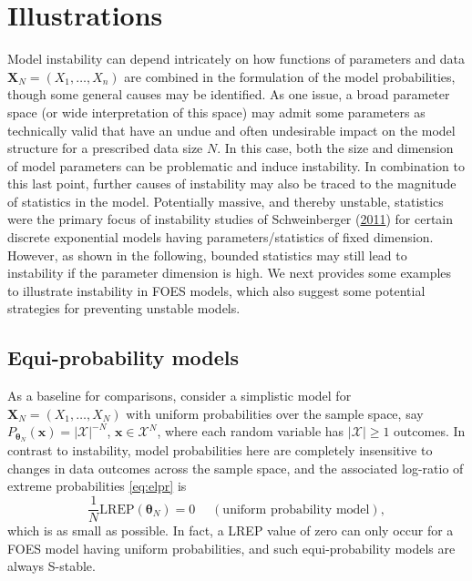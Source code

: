 \documentclass[]{article}
\theoremstyle{definition}
\newcommand{\REP}{\mathrm{LREP}}
\begin{document}
\section{Illustrations}\label{illustrations}

Model instability can depend intricately on how functions of parameters
and data \(\boldsymbol X_N=(X_1,\ldots,X_n)\) are combined in the
formulation of the model probabilities, though some general causes may
be identified. As one issue, a broad parameter space (or wide
interpretation of this space) may admit some parameters as technically
valid that have an undue and often undesirable impact on the model
structure for a prescribed data size \(N\). In this case, both the size
and dimension of model parameters can be problematic and induce
instability. In combination to this last point, further causes of
instability may also be traced to the magnitude of statistics in the
model. Potentially massive, and thereby unstable, statistics were the
primary focus of instability studies of Schweinberger
(\protect\hyperlink{ref-schweinberger2011instability}{2011}) for certain
discrete exponential models having parameters/statistics of fixed
dimension. However, as shown in the following, bounded statistics may
still lead to instability if the parameter dimension is high. We next
provides some examples to illustrate instability in FOES models, which
also suggest some potential strategies for preventing unstable models.

\subsection{Equi-probability models}\label{equi-probability-models}

As a baseline for comparisons, consider a simplistic model for
\(\boldsymbol X_N=(X_1,\ldots,X_N)\) with uniform probabilities over the
sample space, say
\(P_{\boldsymbol \theta_N}(\boldsymbol x)= |\mathcal{X}|^{-N}\),
\(\boldsymbol x \in \mathcal{X}^N\), where each random variable has
\(|\mathcal{X}| \geq 1\) outcomes. In contrast to instability, model
probabilities here are completely insensitive to changes in data
outcomes across the sample space, and the associated log-ratio of
extreme probabilities \eqref{eq:elpr} is \[
\frac{1}{N} \REP(\boldsymbol \theta_N)=0\quad \;(\mbox{uniform probability model}),
\] which is as small as possible. In fact, a LREP value of zero can only
occur for a FOES model having uniform probabilities, and such
equi-probability models are always S-stable.
\end{document}
